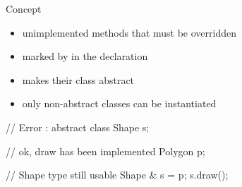 \begin{frame}[fragile]
  \begin{block}{Concept}
    \begin{itemize}
    \item unimplemented methods that must be overridden
    \item marked by  in the declaration
    \item makes their class abstract
    \item only non-abstract classes can be instantiated
    \end{itemize}
  \end{block}
  \pause
  \begin{multicols}{2}
    \begin{cppcode*}{}
      // Error : abstract class
      Shape s;

      // ok, draw has been implemented
      Polygon p;

      // Shape type still usable
      Shape & s = p;
      s.draw();
    \end{cppcode*}
    \columnbreak
  \end{multicols}
\end{frame}

